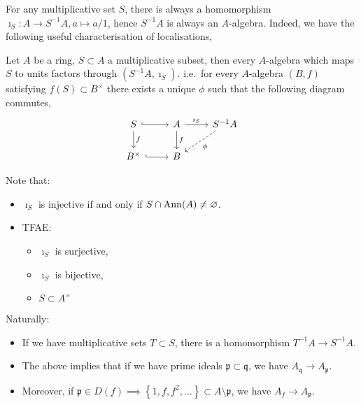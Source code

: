 \documentclass[000-main.tex]{subfiles}
\begin{document}
For any multiplicative set $S$, there is always a homomorphism $\imath_S: A \to S^{-1}A, a\mapsto a/1$, hence $S^{-1}A$ is always an $A$-algebra.
Indeed, we have the following useful characterisation of localisations,
\begin{lemma}
  Let $A$ be a ring, $S\subset A$ a multiplicative subset, then every $A$-algebra which maps $S$ to units factors through $(S^{-1}A, \imath_S)$.
  i.e.\ for every $A$-algebra $(B, f)$ satisfying $f(S)\subset B^{\times}$ there exists a unique $\phi$ such that the following diagram commutes,
  \begin{displaymath}
    \begin{tikzcd}
      S \rar[hook] \dar{f} & A \dar{f} \rar{\imath_S} & S^{-1}A \dlar[dashed]{\phi}\\
      B^{\times} \rar[hook] & B
    \end{tikzcd}
  \end{displaymath}

\end{lemma}
Note that:
\begin{itemize}
  \item $\imath_S$ is injective if and only if $S\cap \operatorname{Ann}(A) \neq \varnothing$.
  \item TFAE:
        \begin{itemize}
          \item $\imath_S$ is surjective,
          \item $\imath_S$ is bijective,
          \item $S \subset A^{\times}$
        \end{itemize}
\end{itemize}

Naturally:
\begin{itemize}
  \item If we have multiplicative sets $T \subset S$, there is a homomorphism $T^{-1}A \to S^{-1}A$.
  \item The above implies that if we have prime ideals $\mathfrak{p}\subset\mathfrak{q}$, we have $A_\mathfrak{q} \to A_\mathfrak{p}$.
  \item Moreover, if $\mathfrak{p}\in D(f) \implies \left\{ 1, f, f^2, \ldots \right\}\subset A\setminus\mathfrak{p}$, we have $A_f \to A_\mathfrak{p}$.
\end{itemize}
\end{document}
